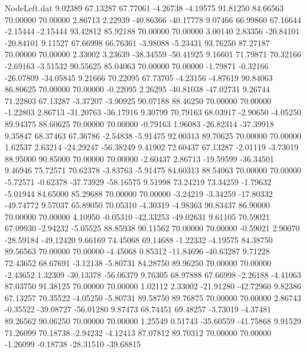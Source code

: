 \begin{filecontents}{NodeLeft.dat}
   9.02389   67.13287   67.77061    -4.26738   -4.19575   91.81250   84.66563   70.00000   70.00000    2.86713    2.22939  -40.86366  -40.17778
   9.07466   66.99860   67.16644    -2.15444   -2.15444   93.42812   85.92188   70.00000   70.00000    3.00140    2.83356  -20.84101  -20.84101
   9.11527   67.66998   66.76361    -3.98088   -5.23431   93.76250   87.27187   70.00000   70.00000    2.33002    3.23639  -38.34559  -50.41925
   9.16601   71.79871   70.32166    -2.69163   -3.51532   90.55625   85.04063   70.00000   70.00000   -1.79871   -0.32166  -26.07809  -34.05845
   9.21666   70.22095   67.73705    -4.23156   -4.87619   90.84063   86.80625   70.00000   70.00000   -0.22095    2.26295  -40.81038  -47.02731
   9.26744   71.22803   67.13287    -3.37207   -3.90925   90.07188   88.46250   70.00000   70.00000   -1.22803    2.86713  -31.20763  -36.17916
   9.30799   70.79163   68.03917    -2.90650   -4.05250   89.94375   88.60625   70.00000   70.00000   -0.79163    1.96083  -26.82314  -37.39918
   9.35847   68.37463   67.36786    -2.54838   -5.91475   92.00313   89.70625   70.00000   70.00000    1.62537    2.63214  -24.29247  -56.38249
   9.41902   72.60437   67.13287    -2.01119   -3.73019   88.95000   90.85000   70.00000   70.00000   -2.60437    2.86713  -19.59599  -36.34501
   9.46946   75.72571   70.62378    -3.83763   -5.91475   84.60313   88.54063   70.00000   70.00000   -5.72571   -0.62378  -37.73929  -58.16575
   9.51998   73.24219   73.34259    -1.79632   -5.01944   84.65000   85.29688   70.00000   70.00000   -3.24219   -3.34259  -17.80332  -49.74772
   9.57037   65.89050   70.05310    -4.30319   -4.98363   90.83437   86.90000   70.00000   70.00000    4.10950   -0.05310  -42.33253  -49.02631
   9.61105   70.59021   67.09930    -2.94232   -5.05525   88.85938   90.11562   70.00000   70.00000   -0.59021    2.90070  -28.59184  -49.12420
   9.66169   74.45068   69.14688    -1.22332   -4.19575   84.38750   89.56563   70.00000   70.00000   -4.45068    0.85312  -11.84696  -40.63287
   9.71228   72.43652   68.67691    -3.12138   -5.80731   84.28750   89.96250   70.00000   70.00000   -2.43652    1.32309  -30.13378  -56.06379
   9.76305   68.97888   67.66998    -2.26188   -4.41063   87.03750   91.38125   70.00000   70.00000    1.02112    2.33002  -21.91280  -42.72960
   9.82386   67.13257   70.35522    -4.05250   -5.80731   89.58750   89.76875   70.00000   70.00000    2.86743   -0.35522  -39.08727  -56.01280
   9.87473   68.74451   69.48257    -3.73019   -4.37481   89.26562   90.06250   70.00000   70.00000    1.25549    0.51743  -35.60559  -41.75868
   9.91529   71.26099   70.18738    -2.94232   -4.12413   87.07812   89.70312   70.00000   70.00000   -1.26099   -0.18738  -28.31510  -39.68815

\end{filecontents}

